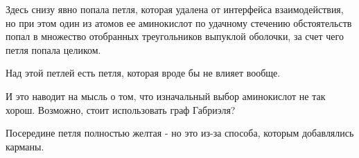 
Здесь снизу явно попала петля, которая удалена от интерфейса взаимодействия, но при этом один из атомов ее аминокислот по удачному стечению обстоятельств попал в множество отобранных треугольников выпуклой оболочки, за счет чего петля попала целиком.

Над этой петлей есть петля, которая вроде бы не влияет вообще. 

И это наводит на мысль о том, что изначальный выбор аминокислот не так хорош. Возможно, стоит использовать граф Габриэля? 


Посередине петля полностью желтая - но это из-за способа, которым добавлялись карманы.


